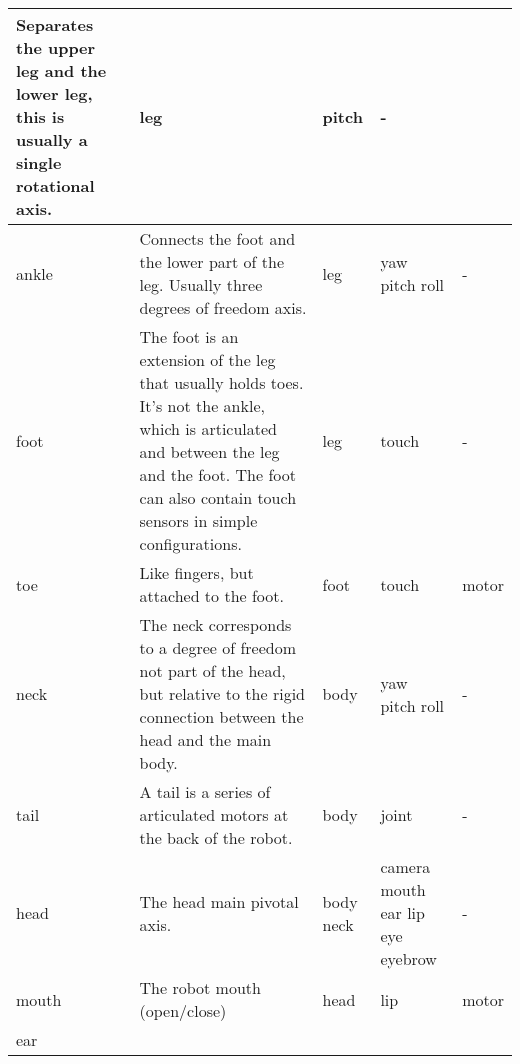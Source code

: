 \documentclass[a4paper]{article}
\begin{document}
\begin{center}
\begin{supertabular}{|m{2.312cm}|m{6.776cm}|m{2.629cm}|m{2.471cm}|m{2.1269999cm}|}
\sffamily Separates the upper leg and the lower
leg, this is usually a single rotational axis. &
\ttfamily leg &
\ttfamily pitch &
\ttfamily {}-\\\hline
{} ankle &
\sffamily Connects the foot and the lower part
of the leg. Usually three degrees of freedom axis. &
\ttfamily leg &
\ttfamily yaw pitch roll &
\ttfamily {}-\\\hline
{} foot &
\sffamily The foot is an extension of the leg
that usually holds toes. It’s not the ankle, which is articulated and
between the leg and the foot. The foot can also contain touch sensors
in simple configurations. &
\ttfamily leg &
\ttfamily touch &
\ttfamily {}-\\\hline
{} toe &
\sffamily Like fingers, but attached to the
foot. &
\ttfamily foot &
\ttfamily touch &
\ttfamily motor\\\hline
{} neck  &
\sffamily The neck corresponds to a degree of
freedom not part of the head, but relative to the rigid connection
between the head and the main body.  &
\ttfamily body &
\ttfamily yaw pitch roll &
\ttfamily {}-\\\hline
{} tail &
\sffamily A tail is a series of articulated
motors at the back of the robot. &
\ttfamily body &
\ttfamily joint &
\ttfamily {}-\\\hline
{} head &
\sffamily The head main pivotal axis. &
\ttfamily body neck &
\ttfamily camera mouth ear lip eye eyebrow &
\ttfamily {}-\\\hline
{} mouth &
\sffamily The robot mouth (open/close) &
\ttfamily head &
\ttfamily lip &
\ttfamily motor\\\hline
{} ear &

\end{supertabular}
\end{center}
\end{document}
